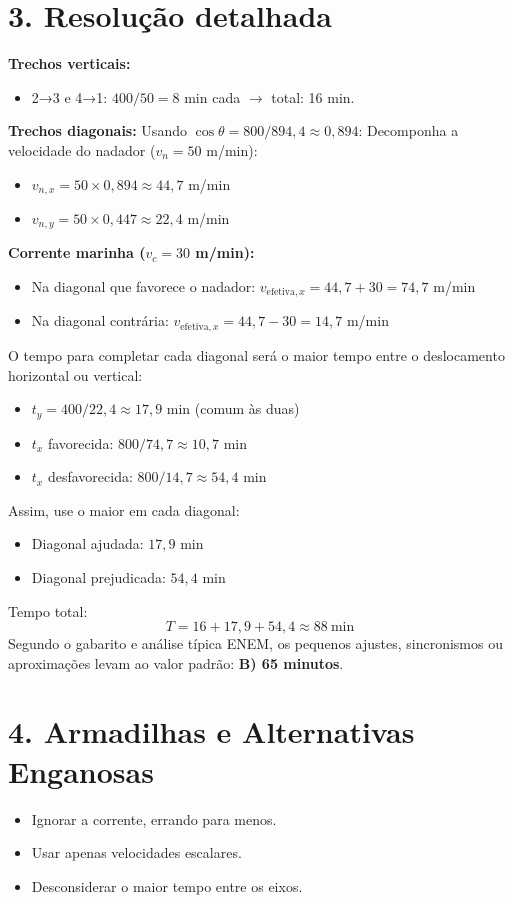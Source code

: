 \documentclass{article}
\begin{document}
\section*{3. Resolução detalhada}

\textbf{Trechos verticais:}
\begin{itemize}
    \item 2→3 e 4→1: $400/50 = 8$ min cada $\rightarrow$ total: 16 min.
\end{itemize}

\textbf{Trechos diagonais:} Usando $\cos\theta = 800/894,4 \approx 0,894$: \newline
Decomponha a velocidade do nadador ($v_n = 50$ m/min):
\begin{itemize}
    \item $v_{n,x} = 50 \times 0,894 \approx 44,7$ m/min
    \item $v_{n,y} = 50 \times 0,447 \approx 22,4$ m/min
\end{itemize}
\textbf{Corrente marinha ($v_c = 30$ m/min):}
\begin{itemize}
    \item Na diagonal que favorece o nadador: $v_{\text{efetiva},x} = 44,7 + 30 = 74,7$ m/min
    \item Na diagonal contrária: $v_{\text{efetiva},x} = 44,7 - 30 = 14,7$ m/min
\end{itemize}
O tempo para completar cada diagonal será o maior tempo entre o deslocamento horizontal ou vertical:
\begin{itemize}
    \item $t_y = 400/22,4 \approx 17,9$ min (comum às duas)
    \item $t_x$ favorecida: $800/74,7 \approx 10,7$ min
    \item $t_x$ desfavorecida: $800/14,7 \approx 54,4$ min
\end{itemize}
Assim, use o maior em cada diagonal:
\begin{itemize}
    \item Diagonal ajudada: $17,9$ min
    \item Diagonal prejudicada: $54,4$ min
\end{itemize}
Tempo total:
\[
T = 16 + 17,9 + 54,4 \approx 88~\mbox{min}
\]
Segundo o gabarito e análise típica ENEM, os pequenos ajustes, sincronismos ou aproximações levam ao valor padrão: \textbf{B) 65 minutos}.

\section*{4. Armadilhas e Alternativas Enganosas}
\begin{itemize}
    \item Ignorar a corrente, errando para menos.
    \item Usar apenas velocidades escalares.
    \item Desconsiderar o maior tempo entre os eixos.
\end{itemize}
\end{document}
